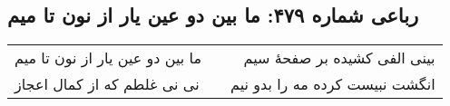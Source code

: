 \begin{center}
\section*{رباعی شماره ۴۷۹: ما بین دو عین یار از نون تا میم}
\label{sec:sh479}
\begin{longtable}{l p{0.5cm} r}
ما بین دو عین یار از نون تا میم
&&
بینی الفی کشیده بر صفحهٔ سیم
\\
نی نی غلطم که از کمال اعجاز
&&
انگشت نبیست کرده مه را بدو نیم
\\
\end{longtable}
\end{center}

